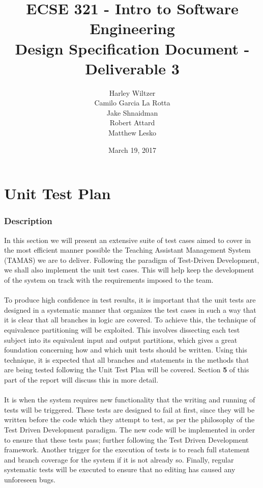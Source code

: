 \documentclass[12pt]{report}
\title{ECSE 321 - Intro to Software Engineering\\Design Specification Document - Deliverable 3}
\author{Harley Wiltzer\\Camilo Garcia La Rotta\\Jake Shnaidman\\Robert Attard\\Matthew Lesko}
\date{March 19, 2017}
\begin{document}
\maketitle
\newpage
{} %
\tableofcontents
\part{Unit Test Plan}
\section{Description}
	In this section we will present an extensive suite of test cases aimed to cover in the most
	efficient manner possible the Teaching Assistant Management System (TAMAS) we are to deliver. Following the
	paradigm of Test-Driven Development, we shall also implement the unit test cases. This will help
	keep the development of the system on track with the requirements imposed to the team. \\\\
	To produce high confidence in test results, it is important that the unit tests are designed in
	a systematic manner that organizes the test cases in such a way that it is clear that all
	branches in logic are covered. To achieve this, the technique of equivalence partitioning will
	be exploited. This involves dissecting each test subject into its equivalent input and output
	partitions, which gives a great foundation concerning how and which unit tests should be
	written. Using this technique, it is expected that all branches and statements in the methods
	that are being tested following the Unit Test Plan will be covered. Section \textbf{5} of this
	part of the report will discuss this in more detail.\\\\
	It is when the system requires new functionality that the writing and running of
	tests will be triggered. These tests are designed to fail at first, since they will be written
	before the code which they attempt to test, as per the philosophy of the Test Driven Development
	paradigm. The new code will be implemented in order to ensure that these tests pass; further
	following the
	Test Driven Development framework. Another trigger for the execution of tests is to reach full
	statement and branch coverage for the system if it is not already so. Finally, regular
	systematic tests will be executed to ensure that no editing has caused any unforeseen bugs.
	
\end{document}
